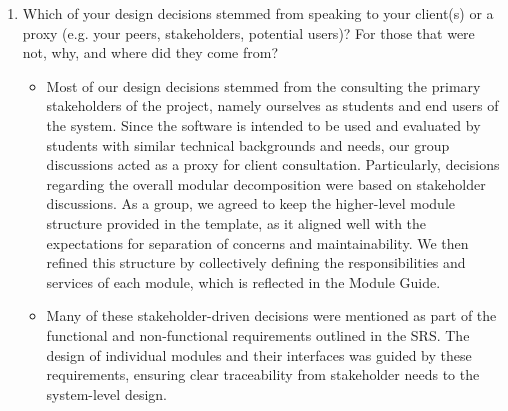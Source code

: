 \documentclass[12pt, titlepage]{article}
\begin{document}
\begin{enumerate}
\begin{itemize}
      \item Jeffrey - The biggest pain point I had during this deliverable was
      trying to keep up with my peers when conceptualizing ideas for our concrete
      system. Since I only have a handful of experiences with app development, I
      was having a hard time helping my teammates come up with modules. Luckily,
      one of the team members Ethan created throw-away code which helped me
      visualize the system better.
      \item Kevin - The main pain point while working on this deliverable was
       getting back into the swing of things after the break. This made our 
       team less organized and communication slower than we should have for 
       this deliverable, meaning that work discussion and delegation were 
       slower. This problem was solved by ensuring that all work and dates 
       were posted on the group discord ensuring that we can still 
       communicate and finish our work even if our communication is slower. 
    \end{itemize}
  \item Which of your design decisions stemmed from speaking to your client(s)
  or a proxy (e.g. your peers, stakeholders, potential users)? For those that
  were not, why, and where did they come from?
    \begin{itemize}
      \item Most of our design decisions stemmed from the consulting the primary
      stakeholders of the project, namely ourselves as students and end users of the
      system. Since the software is intended to be used and evaluated by students
      with similar technical backgrounds and needs, our group discussions acted as
      a proxy for client consultation. Particularly, decisions regarding the
      overall modular decomposition were based on stakeholder discussions. As a
      group, we agreed to keep the higher-level module structure provided in the
      template, as it aligned well with the expectations for separation of concerns
      and maintainability. We then refined this structure by collectively defining
      the responsibilities and services of each module, which is reflected in the
      Module Guide.

      \item Many of these stakeholder-driven decisions were mentioned as part of the
      functional and non-functional requirements outlined in the SRS. The design
      of individual modules and their interfaces was guided by these requirements,
      ensuring clear traceability from stakeholder needs to the system-level design.


\end{itemize}
\end{enumerate}
\end{document}
